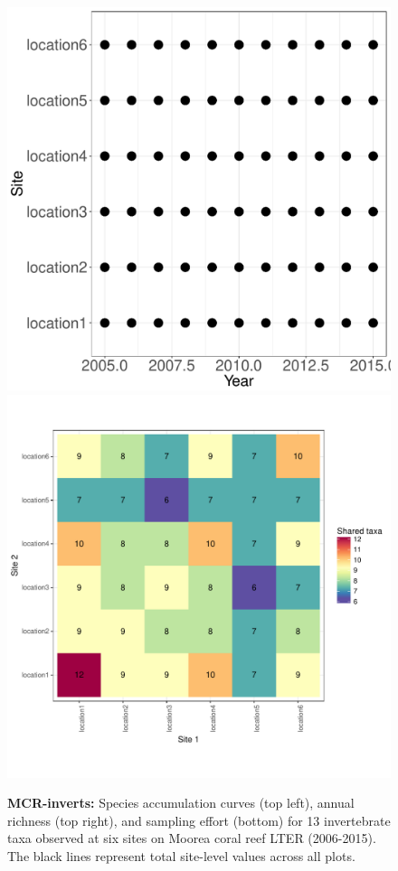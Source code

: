 \documentclass[11pt, oneside]{article}
\begin{document}
\begin{figure}[h!]
\includegraphics[scale = 0.4]{mcr-inverts-castorani_spatiotemporal_sampling_effort.pdf}
\includegraphics[scale = 0.4]{mcr-inverts-castorani_spp_shared.pdf}
\caption{{\bf MCR-inverts:} Species accumulation curves (top left),  annual richness (top right), and sampling effort (bottom)  for 13 invertebrate taxa observed at six sites on Moorea coral reef LTER (2006-2015). The black lines represent total site-level values across all plots.}
\label{mcr-inverts}
\end{figure}
\end{document}
